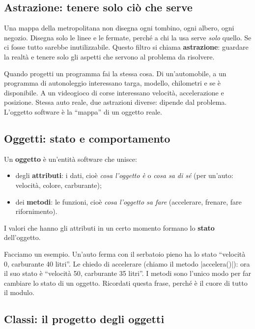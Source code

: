 \subsection*{Astrazione: tenere solo ciò che serve}

\begin{analogia}
Una mappa della metropolitana non disegna ogni tombino, ogni albero, ogni
negozio. Disegna solo le linee e le fermate, perché a chi la usa serve
\emph{solo} quello. Se ci fosse tutto sarebbe inutilizzabile.
Questo filtro si chiama \textbf{astrazione}: guardare la realtà e tenere solo
gli aspetti che servono al problema da risolvere.
\end{analogia}

Quando progetti un programma fai la stessa cosa. Di un'automobile, a un
programma di autonoleggio interessano targa, modello, chilometri e se è
disponibile. A un videogioco di corse interessano velocità, accelerazione e
posizione. Stessa auto reale, due astrazioni diverse: dipende dal problema.
L'oggetto software è la ``mappa'' di un oggetto reale.

\subsection*{Oggetti: stato e comportamento}

\begin{definizione}[: oggetto]
Un \textbf{oggetto} è un'entità software che unisce:
\begin{itemize}
  \item degli \textbf{attributi}: i dati, cioè \emph{cosa l'oggetto è} o \emph{cosa
        sa di sé} (per un'auto: velocità, colore, carburante);
  \item dei \textbf{metodi}: le funzioni, cioè \emph{cosa l'oggetto sa fare}
        (accelerare, frenare, fare rifornimento).
\end{itemize}
I valori che hanno gli attributi in un certo momento formano lo \textbf{stato}
dell'oggetto.
\end{definizione}

Facciamo un esempio. Un'auto ferma con il serbatoio pieno ha lo stato
``velocità 0, carburante 40 litri''. Le chiedo di accelerare (chiamo il metodo
\cc|accelera()|): ora il suo stato è ``velocità 50, carburante 35 litri''.
I metodi sono l'unico modo per far cambiare lo stato di un oggetto. Ricordati
questa frase, perché è il cuore di tutto il modulo.

\subsection*{Classi: il progetto degli oggetti}

